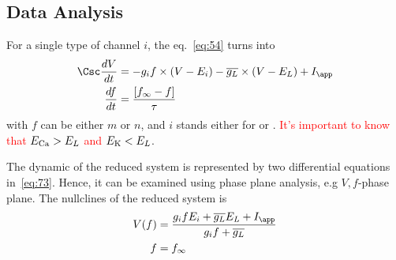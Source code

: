 
\subsection{Data Analysis}
\label{sec:analysis-3}


For a single type of channel $i$, the eq.~\eqref{eq:54} turns into
\begin{equation}
  \label{eq:73}
  \begin{split}
    \Csc\frac{dV}{dt} &= -g_i f \times(V - E_i) - \overline{g_L} \times (V-E_L) + I_\app \\
    \frac{df}{dt} &= \frac{[f_\infty-f]}{\tau}
  \end{split}
\end{equation}
with $f$ can be either $m$ or $n$, and $i$ stands either for 
or .
\textcolor{red}{It's important to know that $E_{\ce{Ca}} > E_L$ and
  $E_{\ce{K}} < E_L$}.

The dynamic of the reduced system is represented by two differential
equations in~\eqref{eq:73}. Hence, it can be examined using phase
plane analysis, e.g $V, f$-phase plane. The nullclines of the reduced
system is
\begin{equation}
  \label{eq:77}
  \begin{split}
    V(f) &= \frac{g_i f E_i+ \overline{g_L} E_L + I_\app}{g_i f + \overline{g_L}} \\
    f &= f_\infty
  \end{split}
\end{equation}


